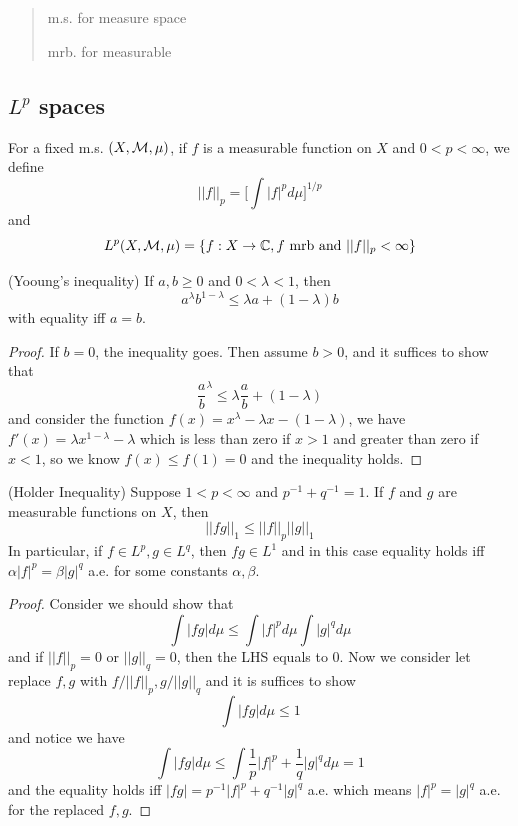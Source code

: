 \chapter{}

\begin{quotation}
m.s. for measure space\par
mrb. for measurable\par
\end{quotation}

\section{$L^p$ spaces}

\begin{definition}
For a fixed m.s. $(X,\mathcal{M},\mu)$, if $f$ is a measurable function on $X$ and $0<p<\infty$, we define
\[||f||_p = \Big[\int |f|^p d\mu\Big]^{1/p}\]
and
\[L^p(X,\mathcal{M},\mu) = \{f:X\to\mathbb{C}, f\text{ mrb and }||f||_p < \infty\}\]
\end{definition}

\begin{lemma}
    (Yooung's inequality) If $a,b\geq 0$ and $0<\lambda<1$, then
    \[a^{\lambda}b^{1-\lambda} \leq \lambda a + (1-\lambda)b\]
    with equality iff $a=b$.
\end{lemma}

\begin{proof}\par
    If $b = 0$, the inequality goes. Then assume $b>0$, and it suffices to show that
    \[\dfrac{a}{b}^{\lambda} \leq \lambda \dfrac{a}{b}+(1-\lambda)\]
    and consider the function $f(x) = x^{\lambda}-\lambda x - (1-\lambda)$, we have $f'(x) = \lambda x^{1-\lambda} - \lambda$ which is less than zero if $x>1$ and greater than zero if $x<1$, so we know $f(x) \leq f(1) = 0$ and the inequality holds.
\end{proof}

\begin{theorem}
    (Holder Inequality) Suppose $1<p<\infty$ and $p^{-1}+q^{-1}=1$. If $f$ and $g$ are measurable functions on $X$, then
    \[||fg||_1 \leq ||f||_p||g||_1\]
    In particular, if $f\in L^p, g\in L^q$, then $fg\in L^1$ and in this case equality holds iff $\alpha|f|^p = \beta|g|^q$ a.e. for some constants $\alpha,\beta$.
\end{theorem}
\begin{proof}\par
    Consider we should show that
    \[
    \int |fg| d\mu \leq \int |f|^pd\mu \int |g|^qd\mu
    \]
    and if $||f||_p = 0$ or $||g||_q = 0$, then the LHS equals to $0$. Now we consider let replace $f,g$ with $f/||f||_p, g/||g||_q$ and it is suffices to show
    \[\int |fg| d\mu \leq 1\]
    and notice we have
    \[
    \int |fg|d\mu \leq \int \dfrac{1}{p}|f|^p+\dfrac{1}{q}|g|^q d\mu = 1
    \]
    and the equality holds iff $|fg| = p^{-1}|f|^p+q^{-1}|g|^q$ a.e. which means $|f|^p = |g|^q$ a.e. for the replaced $f,g$.
\end{proof}


